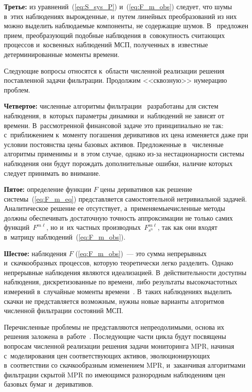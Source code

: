 \begin{multicols}{2}
\textbf{Третье:} из уравнений~(\ref{eq:S_sys_P}) и~(\ref{eq:F_m_obs}) следует, что шумы в~этих наблюдениях  вырожденные, и~путем 
линейных преобразований из них можно выделить наблюдаемые компоненты, не содержащие шумов. 
В~\cite{BS_20} предложен прием, преобразующий подобные наблюдения в~совокупность считающих процессов и~косвенных наблюдений МСП,
 полученных в~известные детерминированные моменты времени.

Следующие вопросы относятся к~области чис\-лен\-ной реализации решения поставленной задачи фильтрации. 
Продолжим <<сквозную>> нумерацию проблем.

\textbf{Четвертое:} численные алгоритмы фильтрации~\cite{B_20_2_ARC} разработаны для систем наблюдения, в~которых параметры динамики и~наблюдений 
не зависят от времени. В~рас\-смот\-рен\-ной финансовой задаче это принципиально не так: с~приближением к~моменту погашения деривативов
 их цена изменяется даже при условии постоянства цены базовых активов. Предложенные 
 в~\cite{B_20_2_ARC} численные алгоритмы применимы и~в этом случае, однако из-за нестационарности сис\-те\-мы наблюдения они будут порождать 
 дополнительные ошибки, наличие которых следует принимать во внимание.
 
 \columnbreak

\textbf{Пятое:} определение функции $F$ цены деривативов как решение сис\-те\-мы~(\ref{eq:F_m_eq}) представляется самостоятельной нетривиальной задачей.
Аналитическое решение ее отсутствует, а~применяемые\linebreak чис\-лен\-ные методы должны обеспечивать достаточную точ\-ность аппроксимации 
не только самих функций~$F^{m\ell}$, но и~их частных производных~$F^{m\ell}_{s^n}$, так как они входят в~мат\-ри\-цу наблюдений~(\ref{eq:F_m_obs}).

\textbf{Шестое:} наблюдения $F$ (\ref{eq:F_m_obs})~--- это сумма непрерывных и~скачкообразных процессов, которую тео\-ре\-ти\-че\-ски легко разделить. Однако
непрерывные наблюдения являются идеализацией. В~действительности доступны наблюдения, дискретизованные по времени, либо результаты высокочастотных 
измерений в~случайные моменты времени~\cite{KCKG_13}. В~таких наблюдениях выделить скачки не пред\-став\-ля\-ет\-ся возможным, нужны новые 
варианты алгоритмов чис\-лен\-ной фильт\-ра\-ции со\-сто\-яний МСП.

Перечисленные проблемы не представляются непреодолимыми, основа их решения заложена в~работе~\cite{BS_20}.
По\-сле\-ду\-ющие час\-ти цик\-ла будут посвящены вопросам чис\-лен\-ной реализации решения задачи мониторинга MPR, 
начиная с~моделирования цен соответствующих активов, эво\-лю\-цио\-ни\-ру\-ющих в~соответствии со скачкообразным изменением MPR, и~заканчивая 
алгоритмами фильт\-ра\-ции скрытой MPR по име\-ющим\-ся разнородным наблюдениям цен базовых бумаг и~деривативов.



\end{multicols}
